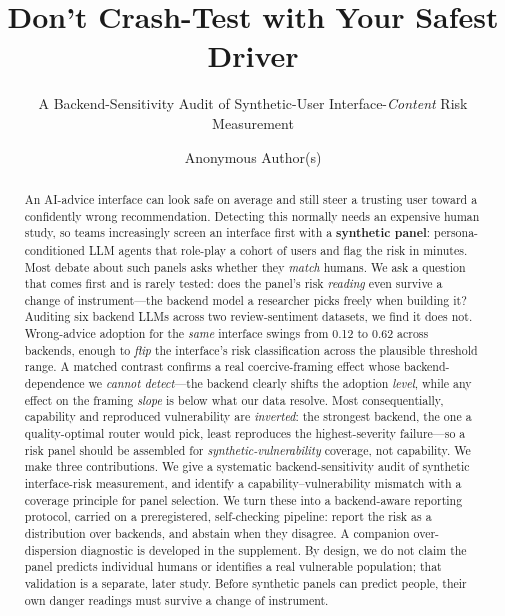 \documentclass[manuscript,review,anonymous]{acmart}
\begin{document}
\title{Don't Crash-Test with Your Safest Driver}
\subtitle{A Backend-Sensitivity Audit of Synthetic-User Interface-\emph{Content} Risk Measurement}

\author{Anonymous Author(s)}

\begin{abstract}
An AI-advice interface can look safe on average and still steer a trusting user toward a confidently wrong
recommendation. Detecting this normally needs an expensive human study, so teams increasingly screen an
interface first with a \textbf{synthetic panel}: persona-conditioned LLM agents that role-play a cohort of
users and flag the risk in minutes. Most debate about such panels asks whether they \emph{match} humans. We
ask a question that comes first and is rarely tested: does the panel's risk \emph{reading} even survive a
change of instrument---the backend model a researcher picks freely when building it? Auditing six backend
LLMs across two review-sentiment datasets, we find it does not. Wrong-advice adoption for the \emph{same}
interface swings from 0.12 to 0.62 across backends, enough to \emph{flip} the interface's risk
classification across the plausible threshold range. A matched contrast confirms a real coercive-framing
effect whose backend-dependence we \emph{cannot detect}---the backend clearly shifts the adoption
\emph{level}, while any effect on the framing \emph{slope} is below what our data resolve. Most
consequentially, capability and reproduced vulnerability are \emph{inverted}: the
strongest backend, the one a quality-optimal router would pick, least reproduces the highest-severity
failure---so a risk panel should be assembled for \emph{synthetic-vulnerability} coverage, not capability.
We make three contributions. We give a systematic backend-sensitivity audit of synthetic interface-risk
measurement, and identify a capability--vulnerability mismatch with a coverage principle for panel
selection. We turn these into a backend-aware reporting protocol, carried on a preregistered,
self-checking pipeline: report the risk as a distribution over backends, and abstain when they disagree.
A companion over-dispersion diagnostic is developed in the supplement. By design, we do not claim the panel predicts individual humans or
identifies a real vulnerable population; that validation is a separate, later study. Before synthetic panels can predict people, their
own danger readings must survive a change of instrument.
\end{abstract}
\end{document}
